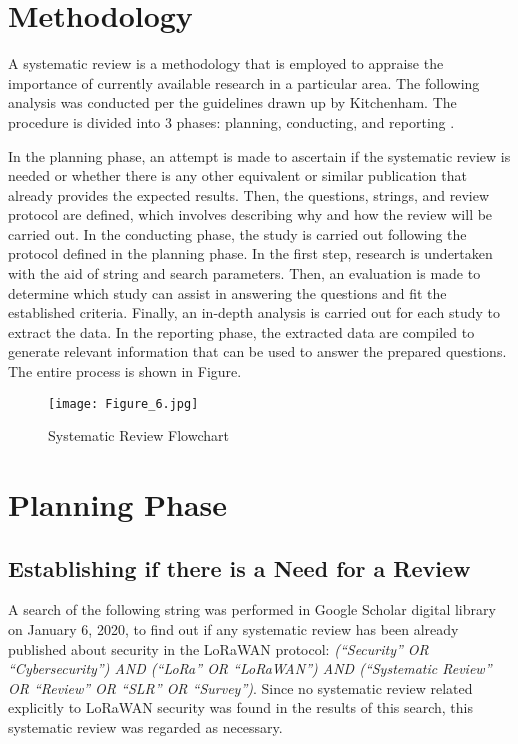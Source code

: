 \documentclass[manuscript,screen,review=false]{acmart}
\begin{document}
\section{Methodology}

A systematic review is a methodology that is employed to appraise the importance of currently available research in a particular area. The following analysis was conducted per the guidelines drawn up by Kitchenham. The procedure is divided into 3 phases: planning, conducting, and reporting \cite{kitchenham}.

In the planning phase, an attempt is made to ascertain if the systematic review is needed or whether there is any other equivalent or similar publication that already provides the expected results. Then, the questions, strings, and review protocol are defined, which involves describing why and how the review will be carried out. In the conducting phase, the study is carried out following the protocol defined in the planning phase. In the first step, research is undertaken with the aid of string and search parameters. Then, an evaluation is made to determine which study can assist in answering the questions and fit the established criteria. Finally, an in-depth analysis is carried out for each study to extract the data. In the reporting phase, the extracted data are compiled to generate relevant information that can be used to answer the prepared questions. The entire process is shown in Figure.

\begin{figure}[h]
  \centering
  \texttt{[image: Figure\_6.jpg]}
  \caption{Systematic Review Flowchart}
\end{figure}

\section{Planning Phase}
\subsection{Establishing if there is a Need for a Review}

A search of the following string was performed in Google Scholar digital library on January 6, 2020, to find out if any systematic review has been already published about security in the LoRaWAN protocol: \textit{(``Security'' OR ``Cybersecurity'') AND (``LoRa'' OR ``LoRaWAN'') AND (``Systematic Review'' OR ``Review'' OR ``SLR'' OR ``Survey'')}. Since no systematic review related explicitly to LoRaWAN security was found in the results of this search, this systematic review was regarded as necessary.
\end{document}
